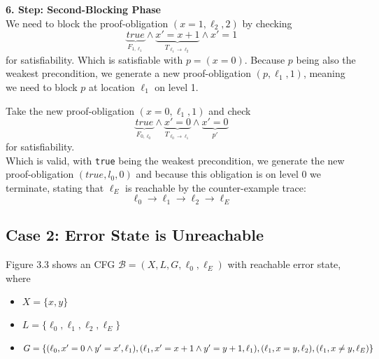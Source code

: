\documentclass[11pt, a4paper, BCOR=10mm, ngerman]{scrbook}
\begin{document}
\textbf{6. Step: Second-Blocking Phase} \\
We need to block the proof-obligation $(x = 1, \ell_2, 2)$ by checking
\begin{equation*}
\underbrace{true}_{F_{1, \ell_1}} \land \underbrace{x' = x + 1}_ {T_{\ell_1 \rightarrow \ell_2}} \land x' = 1
\end{equation*}
for satisfiability. Which is satisfiable with $ p = (x = 0)$. Because $p$ being also the weakest precondition, we generate a new proof-obligation $(p, \ell_1, 1)$, meaning we need to block $p$ at location $\ell_1$ on level 1. \par
Take the new proof-obligation $(x=0, \ell_1, 1)$ and check 
\begin{equation*}
\underbrace{true}_{F_{0, \ell_0}} \land \underbrace{x' = 0}_ {T_{\ell_{0} \rightarrow \ell_1}} \land \underbrace{x' = 0}_{p'}
\end{equation*}
for satisfiability. \\
Which is valid, with \texttt{true} being the weakest precondition, we generate the new proof-obligation $(true, l_0, 0)$ and because this obligation is on level 0 we terminate, stating that $\ell_E$ is reachable by the counter-example trace:
\begin{equation*}
\ell_0 \rightarrow \ell_1 \rightarrow \ell_2 \rightarrow \ell_E
\end{equation*}


\pagebreak

\subsection{Case 2: Error State is Unreachable}
Figure 3.3 shows an CFG $\mathcal{B} = (X, L, G, \ell_0, \ell_E)$ with reachable error state, where
\begin{itemize}
\item $X = \{x, y\}$
\item $L = \{\ell_0, \ell_1, \ell_2, \ell_E\}$
\item $G = \{(\ell_0, x' = 0 \land y' = x', \ell_1), (\ell_1, x' = x+1 \land y' = y+1, \ell_1),\\ (\ell_1, x = y, \ell_2), (\ell_1, x \neq y, \ell_E) \}$
\end{itemize}
\end{document}
